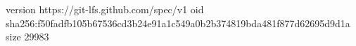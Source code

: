 version https://git-lfs.github.com/spec/v1
oid sha256:f50fadfb105b67536cd3b24e91a1c549a0b2b374819bda481f877d62695d9d1a
size 29983
